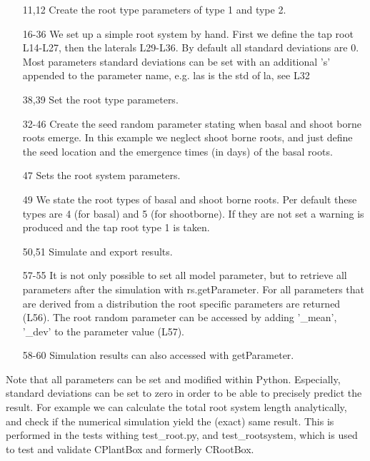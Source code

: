 \documentclass[a4paper]{article}
\begin{document}
\begin{itemize}

\item[11,12] Create the root type parameters of type 1 and type 2.
\item[16-36] We set up a simple root system by hand. First we define the tap root L14-L27, then the laterals L29-L36. By default all standard deviations are 0. Most parameters standard deviations can be set with an additional 's' appended to the parameter name, e.g. las is the std of la, see L32
\item[38,39] Set the root type parameters.

\item[32-46] Create the seed random parameter stating when basal and shoot borne roots emerge. In this example we neglect shoot borne roots, and just define the seed location and  the emergence times (in days) of the basal roots.
\item[47] Sets the root system parameters.

\item[49] We state the root types of basal and shoot borne roots. Per default these types are 4 (for basal) and 5 (for shootborne). If they are not set a warning is produced and the tap root type 1 is taken. 
\item[50,51] Simulate and export results. 

\item[57-55] It is not only possible to set all model parameter, but to retrieve all parameters after the simulation with rs.getParameter. For all parameters that are derived from a distribution the root specific parameters are returned (L56). The root random parameter can be accessed by adding '\_mean', '\_dev' to the parameter value (L57).  

\item[58-60] Simulation results can also accessed with getParameter. 

\end{itemize}

Note that all parameters can be set and modified within Python. Especially, standard deviations can be set to zero in order to be able to precisely predict the result. For example we can calculate the total root system length analytically, and check if the numerical simulation yield the (exact) same result. This is performed in the tests withing test\_root.py, and test\_rootsystem, which is used to test and validate CPlantBox and formerly CRootBox.
\end{document}

